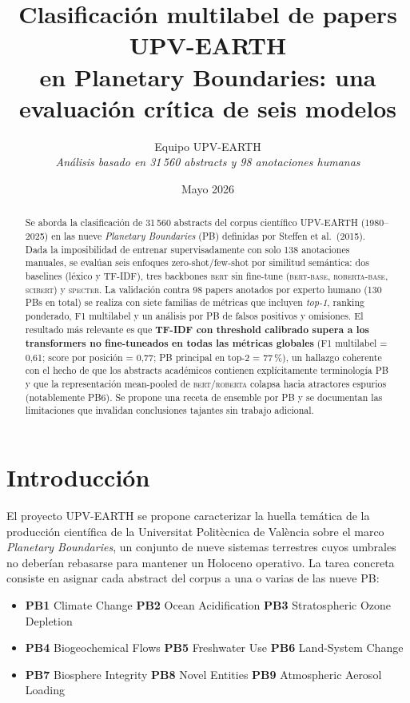 \documentclass[11pt,a4paper]{article}
\title{\Large\textbf{Clasificación multilabel de papers UPV-EARTH\\en Planetary Boundaries: una evaluación crítica de seis modelos}}
\author{Equipo UPV-EARTH \\ \small\textit{Análisis basado en 31\,560 abstracts y 98 anotaciones humanas}}
\date{Mayo 2026}
\begin{document}
\maketitle
\thispagestyle{empty}

\begin{abstract}
\noindent
Se aborda la clasificación de 31\,560 abstracts del corpus científico UPV-EARTH (1980--2025) en las nueve \emph{Planetary Boundaries} (PB) definidas por Steffen et al.\ (2015). Dada la imposibilidad de entrenar supervisadamente con solo 138 anotaciones manuales, se evalúan seis enfoques zero-shot/few-shot por similitud semántica: dos baselines (léxico y TF-IDF), tres backbones \textsc{bert} sin fine-tune (\textsc{bert-base}, \textsc{roberta-base}, \textsc{scibert}) y \textsc{specter}. La validación contra 98 papers anotados por experto humano (130 PBs en total) se realiza con siete familias de métricas que incluyen \emph{top-1}, ranking ponderado, F1 multilabel y un análisis por PB de falsos positivos y omisiones. El resultado más relevante es que \textbf{TF-IDF con threshold calibrado supera a los transformers no fine-tuneados en todas las métricas globales} (F1 multilabel = 0{,}61; score por posición = 0{,}77; PB principal en top-2 = 77\,\%), un hallazgo coherente con el hecho de que los abstracts académicos contienen explícitamente terminología PB y que la representación mean-pooled de \textsc{bert}/\textsc{roberta} colapsa hacia atractores espurios (notablemente PB6). Se propone una receta de ensemble por PB y se documentan las limitaciones que invalidan conclusiones tajantes sin trabajo adicional.
\end{abstract}

\section{Introducción}

El proyecto UPV-EARTH se propone caracterizar la huella temática de la producción científica de la Universitat Politècnica de València sobre el marco \emph{Planetary Boundaries}, un conjunto de nueve sistemas terrestres cuyos umbrales no deberían rebasarse para mantener un Holoceno operativo. La tarea concreta consiste en asignar cada abstract del corpus a una o varias de las nueve PB:

\begin{itemize}
\item \textbf{PB1} Climate Change \quad \textbf{PB2} Ocean Acidification \quad \textbf{PB3} Stratospheric Ozone Depletion
\item \textbf{PB4} Biogeochemical Flows \quad \textbf{PB5} Freshwater Use \quad \textbf{PB6} Land-System Change
\item \textbf{PB7} Biosphere Integrity \quad \textbf{PB8} Novel Entities \quad \textbf{PB9} Atmospheric Aerosol Loading
\end{itemize}
\end{document}
